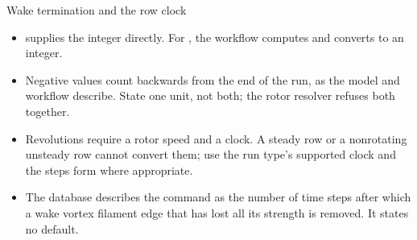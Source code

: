 \begin{frame}{Wake termination and the row clock}
\begin{itemize}\small
  \item {} supplies the integer directly.
        For , the workflow computes
         and converts to an integer.
  \item Negative values count backwards from the end of the run, as the
        model and workflow describe. State one unit, not both; the rotor
        resolver refuses both together.
  \item Revolutions require a rotor speed and a clock. A steady row or
        a nonrotating unsteady row cannot convert them; use the run type's
        supported clock and the steps form where appropriate.
  \item The database describes the command as the number of time steps
        after which a wake vortex filament edge that has lost all its
        strength is removed. It states no default.
\end{itemize}
\end{frame}
